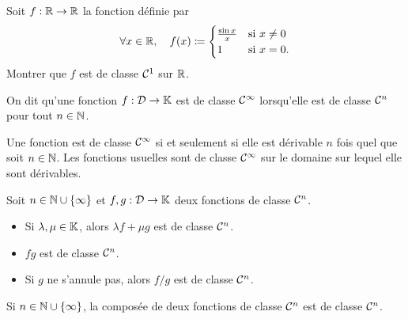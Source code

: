 \documentclass{magnoliaold}
\begin{document}
\begin{exoUnique}
\exo Soit $f:\mathbb{R}\to\mathbb{R}$ la fonction définie par
  \[\forall x\in\mathbb{R},\quad f(x)\coloneqq\begin{cases}\frac{\sin x}{x} & \text{si $x\neq 0$}\\1&\text{si $x=0$.}\end{cases}\]
  Montrer que $f$ est de classe $\mathcal{C}^{1}$ sur $\mathbb{R}$.
\end{exoUnique}

\begin{definition}[utile=-3]
On dit qu'une fonction $f:\mathcal{D}\to\mathbb{K}$ est de classe $\mathcal{C}^{\infty}$ lorsqu'elle est de
classe $\mathcal{C}^{n}$ pour tout $n\in\mathbb{N}$.
\end{definition}

\begin{remarques}
\remarque Une fonction est de classe $\mathcal{C}^{\infty}$ si et seulement si elle
  est dérivable $n$ fois quel que soit $n\in\mathbb{N}$.
\remarque Les fonctions usuelles sont de classe $\mathcal{C}^{\infty}$
  sur le domaine sur lequel elle sont dérivables.
\end{remarques}


\begin{proposition}[utile=-3]
Soit $n\in\mathbb{N}\cup\left\{\infty\right\}$ et $f, g:\mathcal{D}\to\mathbb{K}$ deux fonctions de classe $\mathcal{C}^{n}$.
\begin{itemize}
\item Si $\lambda,\mu\in\mathbb{K}$, alors $\lambda f+\mu g$ est de classe
  $\mathcal{C}^{n}$.
\item $fg$ est de classe $\mathcal{C}^{n}$.
\item Si $g$ ne s'annule pas, alors $f/g$ est de classe $\mathcal{C}^{n}$.
\end{itemize}
\end{proposition}

\begin{proposition}[utile=-3]
Si $n\in\mathbb{N}\cup\left\{\infty\right\}$, la composée de deux fonctions de classe $\mathcal{C}^{n}$ est de classe
$\mathcal{C}^{n}$.
\end{proposition}
\end{document}
